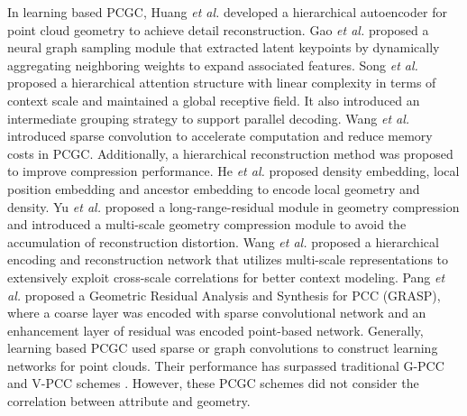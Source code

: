 In learning based PCGC,
Huang \textit{et al.} \cite{huang20193d} developed a hierarchical autoencoder for point cloud geometry to achieve detail reconstruction. Gao \textit{et al.} \cite{5} proposed a neural graph sampling module that extracted latent keypoints by dynamically aggregating neighboring weights to expand associated features. Song \textit{et al.} \cite{song2023efficient} proposed a hierarchical attention structure with linear complexity in terms of context scale and maintained a global receptive field. It also introduced an intermediate grouping strategy to support parallel decoding. Wang \textit{et al.} \cite{4} introduced sparse convolution \cite{11} to accelerate computation and reduce memory costs in PCGC. Additionally, a hierarchical reconstruction method was proposed to improve compression performance. He \textit{et al.} \cite{he2022density} proposed density embedding, local position embedding and ancestor embedding to encode local geometry and density. Yu \textit{et al.} \cite{yu2023sparse} proposed a long-range-residual module in geometry compression and introduced a multi-scale geometry compression module to avoid the accumulation of reconstruction distortion. Wang \textit{et al.} \cite{wang2022sparse} proposed a hierarchical encoding and reconstruction network that utilizes multi-scale representations to extensively exploit cross-scale correlations for better context modeling. Pang \textit{et al.} \cite{pang2022grasp} proposed a Geometric Residual Analysis and Synthesis for PCC (GRASP), where a coarse layer was encoded with sparse convolutional network and an enhancement layer of residual was encoded point-based network. Generally, learning based PCGC used sparse or graph convolutions to construct learning networks for point clouds. Their performance has surpassed traditional G-PCC and V-PCC schemes \cite{yu2023sparse}. However, these PCGC schemes did not consider the correlation between attribute and geometry.

